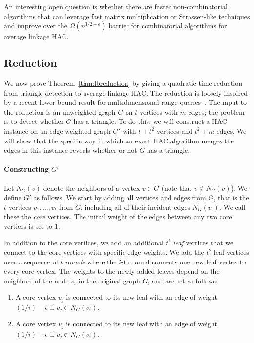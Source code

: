 An interesting open question is whether there are faster non-combinatorial algorithms that can leverage fast matrix multiplication or Strassen-like techniques and improve over the $\Omega(n^{3/2 - \epsilon})$ barrier for combinatorial algorithms for average linkage HAC.

\subsection{Reduction}
We now prove Theorem~\ref{thm:lbreduction} by
giving a quadratic-time reduction from triangle detection to average linkage HAC.
The reduction is loosely inspired by a recent lower-bound result for multidimensional range queries~\cite{lau2021algorithms}.
The input to the reduction is an unweighted graph $G$ on $t$ vertices with $m$ edges; the problem is to detect whether $G$ has a triangle.
To do this, we will construct a HAC instance on an edge-weighted graph $G'$ with $t + t^2$ vertices and $t^2 + m$ edges. 
We will show that the specific way in which an exact HAC algorithm merges the edges in this instance reveals whether or not $G$ has a triangle.

\paragraph{Constructing $G'$}
Let $N_{G}(v)$ denote the neighbors of a vertex $v \in G$ (note that $v \notin N_{G}(v)$).
We define $G'$ as follows. 
We start by adding all vertices and edges from $G$, that is the $t$ vertices $v_1, \ldots, v_t$ from $G$, including all of their incident edges $N_{G}(v_i)$.
We call these the {\em core} vertices. 
The initail weight of the edges between any two core vertices is set to $1$.

In addition to the core vertices, we add an additional $t^2$ {\em leaf} vertices that we connect to the core vertices with specific edge weights.
We add the $t^2$ leaf vertices over a sequence of $t$ {\em rounds} where the $i$-th round connects one new leaf vertex to every core vertex.
The weights to the newly added leaves depend on the neighbors of the node $v_i$ in the original graph $G$, and are set as follows:
\begin{enumerate}[label=(\textbf{\arabic*})]
\item A core vertex $v_j$ is connected to its new leaf with an edge of weight $(1/i) - \epsilon$ if $v_j \in N_{G}(v_i)$.\label{typeone}
\item A core vertex $v_j$ is connected to its new leaf with an edge of weight $(1/i) + \epsilon$ if $v_j \notin N_{G}(v_i)$.\label{typetwo}
\end{enumerate}

